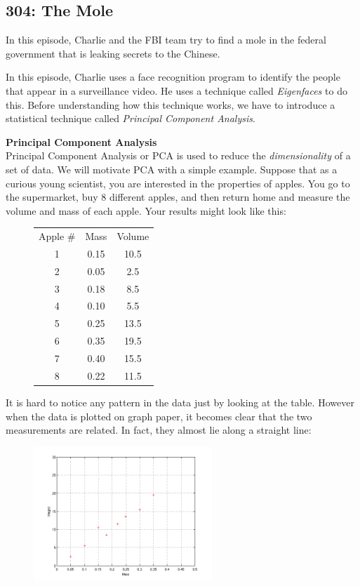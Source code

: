 \newpage
\subsection{304: The Mole\label{304}}

In this episode, Charlie and the FBI team try to find a mole in the federal government that is leaking secrets to the Chinese.


In this episode, Charlie uses a face recognition program to identify the people that appear in a surveillance video. He uses a technique called \emph{Eigenfaces} to do this. Before understanding how this technique works, we have to introduce a statistical technique called \emph{Principal Component Analysis}.

\noindent \textbf{\large Principal Component Analysis} \\

Principal Component Analysis or PCA is used to reduce the \emph{dimensionality} of a set of data. We will motivate PCA with a simple example. Suppose that as a curious young scientist, you are interested in the properties of apples. You go to the supermarket, buy 8 different apples, and then return home and measure the volume and mass of each apple. Your results might look like this:

	\begin{figure}[H]
	\centering
	\begin{tabular}{ccc}
	Apple \# & Mass & Volume \\
	1 & 0.15 & 10.5 \\
	2 & 0.05 & 2.5 \\
	3 & 0.18 & 8.5 \\
	4 & 0.10 & 5.5 \\
	5 & 0.25 & 13.5 \\
	6 & 0.35 & 19.5 \\
	7 & 0.40 & 15.5 \\
	8 & 0.22 & 11.5 
	\end{tabular}
	\end{figure}

It is hard to notice any pattern in the data just by looking at the table. However when the data is plotted on graph paper, it becomes clear that the two measurements are related. In fact, they almost lie along a straight line:
	\begin{figure}[H]
	   \centering
	   \includegraphics[width=0.6\textwidth]{season3/304/images/applegraph1.png} 
	\end{figure}

